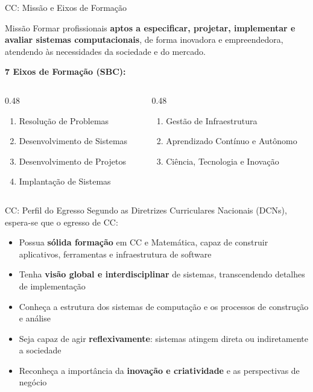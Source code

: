 \documentclass[aspectratio=169]{beamer}
\newcommand{\impt}[1]{\textcolor{morange}{\textbf{#1}}}
\begin{document}
\begin{frame}{CC: Missão e Eixos de Formação}
  \begin{block}{Missão}
    Formar profissionais \impt{aptos a especificar, projetar, implementar e avaliar sistemas computacionais}, de forma inovadora e empreendedora, atendendo às necessidades da sociedade e do mercado.
  \end{block}
  \vspace{0.2cm}
  \textbf{7 Eixos de Formação (SBC):}
  \begin{columns}[T]
    \begin{column}{0.48\textwidth}
      \begin{enumerate}\setlength\itemsep{2pt}
        \item Resolução de Problemas
        \item Desenvolvimento de Sistemas
        \item Desenvolvimento de Projetos
        \item Implantação de Sistemas
      \end{enumerate}
    \end{column}
    \begin{column}{0.48\textwidth}
      \begin{enumerate}\setlength\itemsep{2pt}
        \setcounter{enumi}{4}
        \item Gestão de Infraestrutura
        \item Aprendizado Contínuo e Autônomo
        \item Ciência, Tecnologia e Inovação
      \end{enumerate}
    \end{column}
  \end{columns}
\end{frame}

\begin{frame}{CC: Perfil do Egresso}
  Segundo as Diretrizes Curriculares Nacionais (DCNs), espera-se que o egresso de CC:
  \begin{itemize}
    \item Possua \textbf{sólida formação} em CC e Matemática, capaz de construir aplicativos, ferramentas e infraestrutura de software
    \item Tenha \textbf{visão global e interdisciplinar} de sistemas, transcendendo detalhes de implementação
    \item Conheça a estrutura dos sistemas de computação e os processos de construção e análise
    \item Seja capaz de agir \textbf{reflexivamente}: sistemas atingem direta ou indiretamente a sociedade
    \item Reconheça a importância da \textbf{inovação e criatividade} e as perspectivas de negócio
  \end{itemize}
\end{frame}
\end{document}
